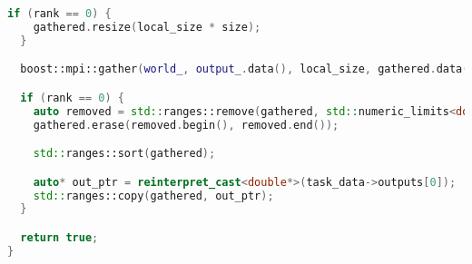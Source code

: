 \documentclass[12pt]{article}
\begin{document}
\begin{lstlisting}[language=C++,
    breaklines=true,       % Автоматический перенос строк
    columns=fullflexible ]
  if (rank == 0) {
    gathered.resize(local_size * size);
  }

  boost::mpi::gather(world_, output_.data(), local_size, gathered.data(), 0);

  if (rank == 0) {
    auto removed = std::ranges::remove(gathered, std::numeric_limits<double>::max());
    gathered.erase(removed.begin(), removed.end());

    std::ranges::sort(gathered);

    auto* out_ptr = reinterpret_cast<double*>(task_data->outputs[0]);
    std::ranges::copy(gathered, out_ptr);
  }

  return true;
}
\end{lstlisting}
\end{document}
